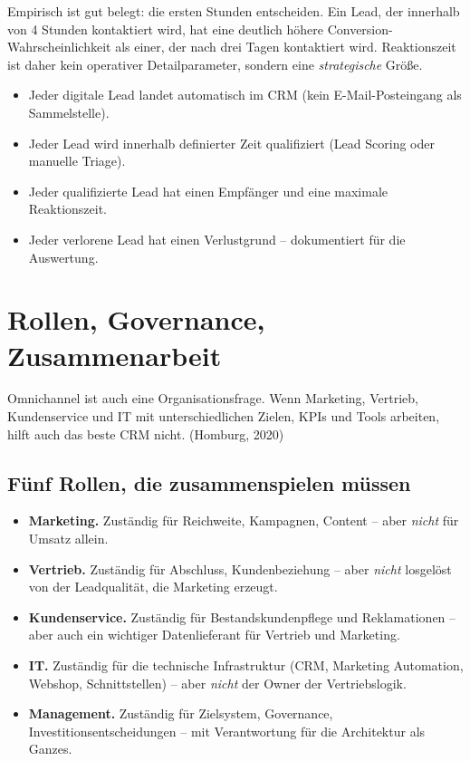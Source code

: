 \documentclass[11pt,a4paper,oneside]{article}
\newcommand{\fachbegriff}[1]{\textbf{#1}}
\newcommand{\quelle}[1]{{\footnotesize\color{lpGray}(#1)}}
\begin{document}
Empirisch ist gut belegt: die ersten Stunden entscheiden. Ein Lead, der innerhalb von 4 Stunden kontaktiert wird, hat eine deutlich höhere Conversion-Wahrscheinlichkeit als einer, der nach drei Tagen kontaktiert wird. Reaktionszeit ist daher kein operativer Detailparameter, sondern eine \emph{strategische} Größe.

\begin{merkbox}
\begin{itemize}
  \item Jeder digitale Lead landet automatisch im CRM (kein E-Mail-Posteingang als Sammelstelle).
  \item Jeder Lead wird innerhalb definierter Zeit qualifiziert (Lead Scoring oder manuelle Triage).
  \item Jeder qualifizierte Lead hat einen Empfänger und eine maximale Reaktionszeit.
  \item Jeder verlorene Lead hat einen Verlustgrund -- dokumentiert für die Auswertung.
\end{itemize}
\end{merkbox}

\section{Rollen, Governance, Zusammenarbeit}

Omnichannel ist auch eine Organisationsfrage. Wenn Marketing, Vertrieb, Kundenservice und IT mit unterschiedlichen Zielen, KPIs und Tools arbeiten, hilft auch das beste CRM nicht. \quelle{Homburg, 2020}

\subsection{Fünf Rollen, die zusammenspielen müssen}

\begin{itemize}
  \item \fachbegriff{Marketing.} Zuständig für Reichweite, Kampagnen, Content -- aber \emph{nicht} für Umsatz allein.
  \item \fachbegriff{Vertrieb.} Zuständig für Abschluss, Kundenbeziehung -- aber \emph{nicht} losgelöst von der Leadqualität, die Marketing erzeugt.
  \item \fachbegriff{Kundenservice.} Zuständig für Bestandskundenpflege und Reklamationen -- aber auch ein wichtiger Datenlieferant für Vertrieb und Marketing.
  \item \fachbegriff{IT.} Zuständig für die technische Infrastruktur (CRM, Marketing Automation, Webshop, Schnittstellen) -- aber \emph{nicht} der Owner der Vertriebslogik.
  \item \fachbegriff{Management.} Zuständig für Zielsystem, Governance, Investitionsentscheidungen -- mit Verantwortung für die Architektur als Ganzes.
\end{itemize}
\end{document}
